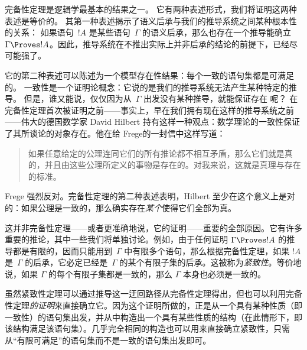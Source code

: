 \documentclass[../../../include/open-logic-section]{subfiles}
\begin{document}
      {}
      {}


完备性定理是逻辑学最基本的结果之一。
它有两种表述形式，我们将证明这两种表述是等价的。
其第一种表述揭示了语义后承与我们的推导系统之间某种根本性的关系：
如果语句~$!A$ 是某些语句~$\Gamma$ 的语义后承，那么也存在一个推导能确立 $\Gamma
\Proves !A$。因此，推导系统在不推出实际上并非后承的结论的前提下，已经尽可能强了。

它的第二种表述可以陈述为一个模型存在性结果：每个一致的语句集都是可满足的。
一致性是一个证明论概念：它说的是我们的推导系统无法产生某种特定的推导。
但是，谁又能说，仅仅因为从~$\Gamma$ 出发没有某种推导，就能保证存在
呢？
在完备性定理首次被证明之前——事实上，早在我们拥有现在这样的推导系统之前——伟大的德国数学家 David Hilbert 持有这样一种观点：数学理论的一致性保证了其所谈论的对象存在。他在给 Frege的一封信中这样写道：

\begin{quote}
  如果任意给定的公理连同它们的所有推论都不相互矛盾，那么它们就是真的，并且由这些公理所定义的事物是存在的。对我来说，这就是真理与存在的标准。
\end{quote}

Frege 强烈反对。完备性定理的第二种表述表明，Hilbert 至少在这个意义上是对的：如果公理是一致的，那么确实存在\emph{某个}使得它们全部为真。

这并非完备性定理——或者更准确地说，它的证明——重要的全部原因。它有许多重要的推论，其中一些我们将单独讨论。例如，由于任何证明 $\Gamma \Proves !A$ 的推导都是有限的，因而只能用到~$\Gamma$ 中有限多个语句，那么根据完备性定理，如果 $!A$ 是~$\Gamma$ 的后承，它必定已经是~$\Gamma$ 的某个有限子集的后承。这被称为\emph{紧致性}。等价地说，如果 $\Gamma$ 的每个有限子集都是一致的，那么 $\Gamma$ 本身也必须是一致的。

虽然紧致性定理可以通过推导这一迂回路径从完备性定理得出，但也可以利用完备性定理\emph{的证明}来直接确立它。因为这个证明所做的，正是从一个具有某种性质（即一致性）的语句集出发，并从中构造出一个具有某些性质的结构（在此情形下，即该结构满足该语句集）。几乎完全相同的构造也可以用来直接确立紧致性，只需从“有限可满足”的语句集而不是一致的语句集出发即可。
\end{document}
